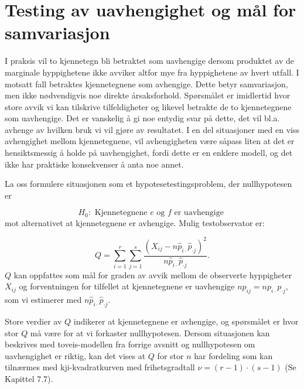 \section{Testing av uavhengighet og \newline mål for samvariasjon}

I praksis vil to kjennetegn bli betraktet som uavhengige dersom
produktet av de marginale hyppighetene ikke avviker altfor mye fra
hyppighetene av hvert utfall.  I motsatt fall betraktes kjennetegnene
som avhengige. Dette betyr samvariasjon, men ikke nødvendigvis noe direkte
årsaksforhold.  Spørsmålet er imidlertid hvor store avvik
vi kan tilskrive tilfeldigheter og likevel betrakte de to kjennetegnene
som uavhengige.  Det er vanskelig å gi noe entydig
svar på dette, det vil bl.a. avhenge av hvilken bruk vi vil gjøre
av resultatet.  I en del situasjoner med en viss avhengighet mellom
kjennetegnene, vil avhengigheten være såpass liten at det er
hensiktsmessig å holde på uavhengighet, fordi dette er en enklere
modell, og det ikke har praktiske konsekvenser å anta noe annet.

La oss formulere situasjonen som et hypotese\-testingsproblem, der
nullhypotesen er

\[ H_0 : \mbox{\ Kjennetegnene $e$ og $f$ er uavhengige }  \]
mot alternativet at kjennetegnene er avhengige. Mulig testobservator er:

\[ Q=\sum_{i=1}^{r}\sum_{j=1}^{s}
       \frac{{(X_{ij}-n{\hat{p}}_{i\cdot}{\hat{p}}_{\cdot j})}^2}
                           {n{\hat{p}}_{i\cdot}{\hat{p}}_{\cdot j}} .    \]
$Q$ kan oppfattes som mål for graden av avvik mellom de observerte
hyppigheter $X_{ij}$ og forventningen for tilfellet at kjennetegnene er 
uavhengige $np_{ij}=np_{i\cdot}p_{\cdot j}$, som vi estimerer med
$n{\hat{p}}_{i\cdot}{\hat{p}}_{\cdot j}$.

Store verdier av $Q$ indikerer at kjennetegnene er avhengige, og
spørsmålet er hvor stor $Q$ må være for at vi forkaster
nullhypotesen. Dersom situasjonen kan beskrives med toveis-modellen fra
forrige avsnitt og nullhypotesen om uavhengighet er riktig, kan det vises at
$Q$ for stor $n$  har fordeling som kan tilnærmes med kji-kvadratkurven
med frihetsgradtall $\nu = (r-1)\cdot (s-1)$ (Se Kapittel 7.7).\\

